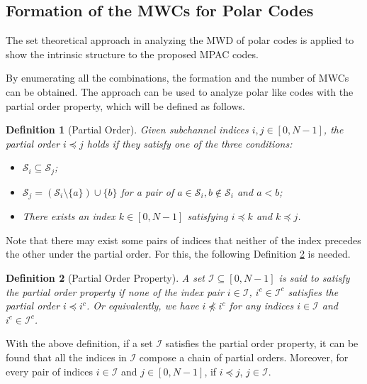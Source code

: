 \documentclass[12pt, draftclsnofoot, peerreview, onecolumn]{IEEEtran}
\theoremstyle{noparent}
\newtheorem{definition}{\textbf{{Definition}}}
\begin{document}
\subsection{Formation of the MWCs for Polar Codes}
\label{Formation_of_the_MWCs_for_Polar_codes}
The set theoretical approach \cite{Rowshan2023FormationMinweight} 
in analyzing the MWD of polar codes is applied to show the intrinsic structure to 
the proposed MPAC codes.





By enumerating all the combinations, 
the formation and the number of MWCs can be obtained.
The approach can be used to analyze polar like codes with the partial order property, which will be defined as follows.

\begin{definition}[Partial Order\cite{Schurch2016}]
    \label{defi_partial_order}
    Given subchannel indices $i,j\in [0,N-1]$,
    the partial order $i \preceq j$ holds if 
    they satisfy one of the three conditions:
    \begin{itemize}
        \item $\mathcal{S}_{i} \subseteq \mathcal{S}_{j}$;
        \item $\mathcal{S}_{j}=(\mathcal{S}_{i}\setminus\{a\})\cup\{b\}$ for a pair of 
        $a\in \mathcal{S}_{i},b\notin\mathcal{S}_{i}$ and $a<b$;
        \item There exists an index $k \in\left[0,N-1\right]$ satisfying $i \preceq k$ and  $k \preceq j$.
    \end{itemize}
\end{definition}


Note that there may exist some pairs of indices
that neither of the index precedes the other under the partial order.
For this, the following Definition \ref{defi_POP} is needed.

\begin{definition}[Partial Order Property\cite{Rowshan2023FormationMinweight}]
    \label{defi_POP}
    A set $\mathcal{I}\subseteq\left[0,N-1\right]$ 
    is said to satisfy the partial order property if 
    none of the index pair $i\in\mathcal{I}$, 
    $i^{c}\in\mathcal{I}^{c}$ satisfies the partial order
    $i \preceq i^{c}$.
    Or equivalently, we have $i \npreceq i^{c}$ for any indices
    $i\in\mathcal{I}$ and $i^{c}\in\mathcal{I}^{c}$.
\end{definition}

With the above definition, if a set $\mathcal{I}$ 
satisfies the partial order property,
it can be found that all the indices in $\mathcal{I}$ 
compose a chain of partial orders. 
Moreover, for every pair of indices $i \in \mathcal{I}$ and $j \in[0, N-1]$, 
if $i \preceq j$, $j \in \mathcal{I}$.
\end{document}
